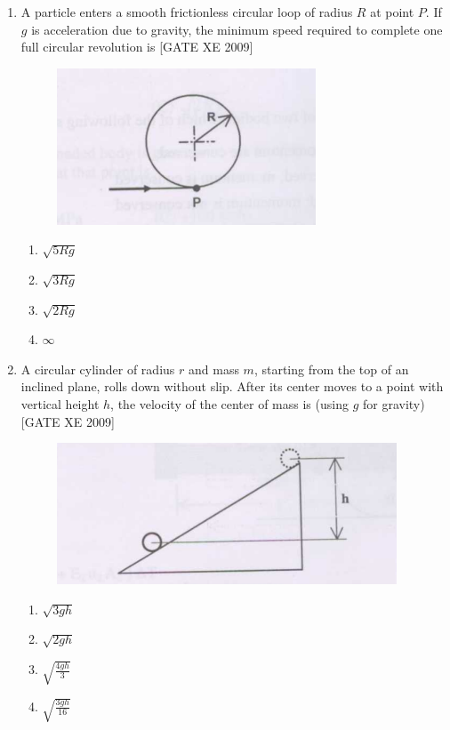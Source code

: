 \documentclass[journal,12pt,onecolumn]{IEEEtran}
\theoremstyle{remark}
\begin{document}
\begin{enumerate}
\item A particle enters a smooth frictionless circular loop of radius $R$ at point $P$. If $g$ is acceleration due to gravity, the minimum speed required to complete one full circular revolution is \hfill[GATE XE 2009]
\begin{figure}[H]
    \centering
    \includegraphics[width=0.5\linewidth]{figs/fig12.png}
    \caption*{}
    \label{fig:Q 71}
\end{figure}

\begin{multicols}{2}
\begin{enumerate}
    \item $\sqrt{5Rg}$
    \item $\sqrt{3Rg}$
    \item $\sqrt{2Rg}$
    \item $\infty$
\end{enumerate}
\end{multicols}




\item A circular cylinder of radius $r$ and mass $m$, starting from the top of an inclined plane, rolls down without slip. After its center moves to a point with vertical height $h$, the velocity of the center of mass is (using $g$ for gravity)\hfill[GATE XE 2009] 
\begin{figure}[H]
    \centering
    \includegraphics[width=0.5\linewidth]{figs/fig13.png}
    \caption*{}
    \label{fig:Q 72}
\end{figure}

\begin{multicols}{2}
\begin{enumerate}
    \item $\sqrt{3gh}$
    \item $\sqrt{2gh}$
    \item $\sqrt{\frac{4gh}{3}}$
    \item $\sqrt{\frac{3gh}{16}}$
\end{enumerate}
\end{multicols}





\end{enumerate}
\end{document}
